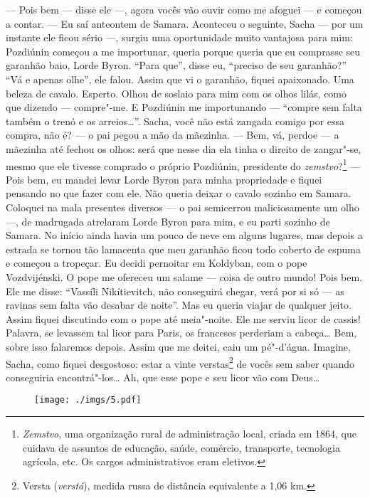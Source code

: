 --- Pois bem --- disse ele ---, agora vocês vão ouvir como me afoguei
--- e começou a contar. --- Eu saí anteontem de Samara. Aconteceu o
seguinte, Sacha --- por um instante ele ficou sério ---, surgiu uma
oportunidade muito vantajosa para mim: Pozdiúnin começou a me
importunar, queria porque queria que eu comprasse seu garanhão baio,
Lorde Byron. ``Para que'', disse eu, ``preciso de seu garanhão?'' ``Vá e
apenas olhe'', ele falou. Assim que vi o garanhão, fiquei apaixonado.
Uma beleza de cavalo. Esperto. Olhou de soslaio para mim com os olhos
lilás, como que dizendo --- compre"-me. E Pozdiúnin me importunando ---
``compre sem falta também o trenó e os arreios\ldots{}''. Sacha, você não
está zangada comigo por essa compra, não é? --- o pai pegou a mão da
mãezinha. --- Bem, vá, perdoe --- a mãezinha até fechou os olhos: será
que nesse dia ela tinha o direito de zangar"-se, mesmo que ele tivesse
comprado o próprio Pozdiúnin, presidente do \emph{zemstvo}?\footnote{\emph{Zemstvo},
  uma organização rural de administração local, criada em 1864, que
  cuidava de assuntos de educação, saúde, comércio, transporte,
  tecnologia agrícola, etc. Os cargos administrativos eram eletivos.}
--- Pois bem, eu mandei levar Lorde Byron para minha propriedade e
fiquei pensando no que fazer com ele. Não queria deixar o cavalo sozinho
em Samara. Coloquei na mala presentes diversos --- o pai semicerrou
maliciosamente um olho ---, de madrugada atrelaram Lorde Byron para mim,
e eu parti sozinho de Samara. No início ainda havia um pouco de neve em
alguns lugares, mas depois a estrada se tornou tão lamacenta que meu
garanhão ficou todo coberto de espuma e começou a tropeçar. Eu decidi
pernoitar em Koldyban, com o pope Vozdvijénski. O pope me ofereceu um
salame --- coisa de outro mundo! Pois bem. Ele me disse: ``Vassíli
Nikítievitch, não conseguirá chegar, verá por si só --- as ravinas sem
falta vão desabar de noite''. Mas eu queria viajar de qualquer jeito.
Assim fiquei discutindo com o pope até meia"-noite. Ele me serviu licor
de cassis! Palavra, se levassem tal licor para Paris, os franceses
perderiam a cabeça\ldots{} Bem, sobre isso falaremos depois. Assim que me
deitei, caiu um pé"-d'água. Imagine, Sacha, como fiquei desgostoso: estar
a vinte verstas\footnote{Versta (\emph{verstá}), medida russa de
  distância equivalente a 1,06 km.} de vocês sem saber quando
conseguiria encontrá"-los\ldots{} Ah, que esse pope e seu licor vão com
Deus\ldots{}

\begin{figure}
\vspace*{-2.65cm}
\hspace*{-2.85cm}\texttt{[image: ./imgs/5.pdf]}
\end{figure}

